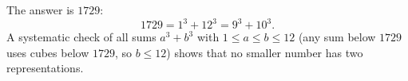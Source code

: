 The answer is $\boxed{1729}$:
\[
1729=1^3+12^3=9^3+10^3 .
\]
A systematic check of all sums $a^3+b^3$ with $1\le a\le b\le12$ (any sum below $1729$ uses cubes below $1729$, so $b\le12$) shows that no smaller number has two representations.
